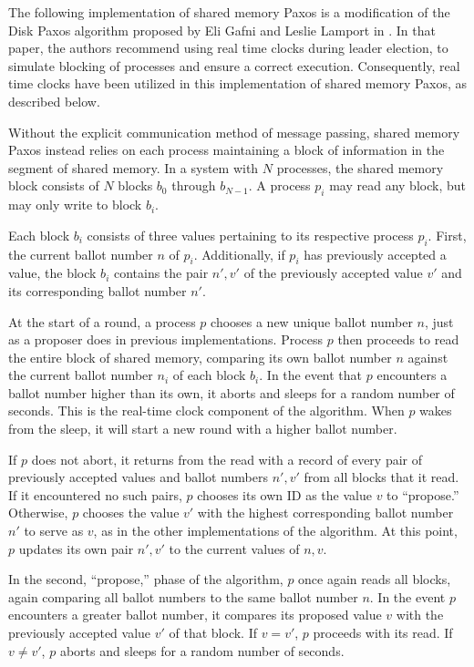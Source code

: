 \documentclass[12pt]{article}
\begin{document}
The following implementation of shared memory Paxos is a modification of the Disk Paxos
algorithm proposed by Eli Gafni and Leslie Lamport in \cite{disk}. In that paper, the authors
recommend using real time clocks during leader election, to simulate blocking of processes
and ensure a correct execution. Consequently, real time clocks have been utilized in this
implementation of shared memory Paxos, as described below.

Without the explicit communication method of message passing, shared memory Paxos
instead relies on each process maintaining a block of information in the segment
of shared memory. In a system with $N$ processes, the shared memory block consists
of $N$ blocks $b_0$ through $b_{N-1}$. A process $p_i$ may read any block, but
may only write to block $b_i$.

Each block $b_i$ consists of three values pertaining to its respective process $p_i$.
First, the current ballot number $n$ of $p_i$. Additionally, if $p_i$ has previously
accepted a value, the block $b_i$ contains the pair $n', v'$ of the previously accepted
value $v'$ and its corresponding ballot number $n'$.

At the start of a round, a process $p$ chooses a new unique ballot number $n$, just as a
proposer does in previous implementations. Process $p$ then proceeds to read the entire
block of shared memory, comparing its own ballot number $n$ against the current ballot
number $n_i$ of each block $b_i$. In the event that $p$ encounters a ballot number higher
than its own, it aborts and sleeps for a random number of seconds. This is the real-time clock
component of the algorithm. When $p$ wakes from the sleep, it will start a new round with a higher
ballot number.

If $p$ does not abort, it returns from the read with a record of every pair of previously
accepted values and ballot numbers $n', v'$ from all blocks that it read. If it encountered
no such pairs, $p$ chooses its own ID as the value $v$ to ``propose.'' Otherwise, $p$ chooses
the value $v'$ with the highest corresponding ballot number $n'$ to serve as $v$,
as in the other implementations of the algorithm. At this point, $p$ updates its
own pair $n', v'$ to the current values of $n, v$.

In the second, ``propose,'' phase of the algorithm, $p$ once again reads all blocks, again
comparing all ballot numbers to the same ballot number $n$. In the event $p$ encounters
a greater ballot number, it compares its proposed value $v$ with the previously accepted value
$v'$ of that block. If $v = v'$, $p$ proceeds with its read. If $v \neq v'$, $p$ aborts and
sleeps for a random number of seconds.
\end{document}
